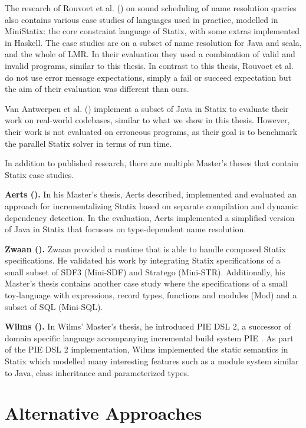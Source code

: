       The research of Rouvoet et al. (\citeyear{RouvoetAPKV20}) on sound scheduling of name resolution queries also contains various case studies of languages used in practice, modelled in MiniStatix: the core constraint language of Statix, with some extras implemented in Haskell. The case studies are on a subset of name resolution for Java and scala, and the whole of LMR. In their evaluation they used a combination of valid and invalid programs, similar to this thesis. In contrast to this thesis, Rouvoet et al. do not use error message expectations, simply a fail or succeed expectation but the aim of their evaluation was different than ours. 

      Van Antwerpen et al. (\citeyear{AntwerpenV21}) implement a subset of Java in Statix to evaluate their work on real-world codebases, similar to what we show in this thesis. However, their work is not evaluated on erroneous programs, as their goal is to benchmark the parallel Statix solver in terms of run time.

      In addition to published research, there are multiple Master's theses that contain Statix case studies.

      \textbf{Aerts (\citeyear{Aerts2019}).} In his Master's thesis, Aerts described, implemented and evaluated an approach for incrementalizing Statix based on separate compilation and dynamic dependency detection. In the evaluation, Aerts implemented a simplified version of Java in Statix that focusses on type-dependent name resolution.

      \textbf{Zwaan (\citeyear{Zwaan2021}).} Zwaan provided a runtime that is able to handle composed Statix specifications. He validated his work by integrating Statix specifications of a small subset of SDF3 (Mini-SDF) and Stratego (Mini-STR). Additionally, his Master's thesis contains another case study where the specifications of a small toy-language with expressions, record types, functions and modules (Mod) and a subset of SQL (Mini-SQL).

      \textbf{Wilms (\citeyear{Wilms2022}).} In Wilms' Master's thesis, he introduced PIE DSL 2, a successor of domain specific language accompanying incremental build system PIE \autocite{KonatSEV19}. As part of the PIE DSL 2 implementation, Wilms implemented the static semantics in Statix which modelled many interesting features such as a module system similar to Java, class inheritance and parameterized types.

  \section{Alternative Approaches}

